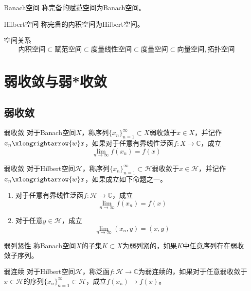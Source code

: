 \documentclass[lang = cn, scheme = chinese, thmcnt = section]{elegantbook}
\newcommand{\C}{\mathbb{C}}  		   %
\newcommand{\sub}{\subset}             %
\begin{document}
\begin{definition}{Banach空间}
	称完备的赋范空间为Banach空间。
\end{definition}

\begin{definition}{Hilbert空间}
	称完备的内积空间为Hilbert空间。
\end{definition}

\begin{proposition}{空间关系}
	$$
	\text{内积空间}
	\sub\text{赋范空间}
	\sub\text{度量线性空间}
	\sub\text{度量空间}
	\sub\text{向量空间},\text{拓扑空间}
	$$
\end{proposition}

\chapter{弱收敛与弱*收敛}

\section{弱收敛}

\begin{definition}{弱收敛}
	对于Banach空间$X$，称序列$\{x_n\}_{n=1}^{\infty}\sub X$弱收敛于$x\in X$，并记作$x_n\xlongrightarrow{w}x$，如果对于任意有界线性泛函$f:X\to\C$，成立
	$$
	\lim_{n\to\infty}f(x_n)=f(x)
	$$
\end{definition}

\begin{definition}{弱收敛}
	对于Hilbert空间$\mathcal{H}$，称序列$\{x_n\}_{n=1}^{\infty}\sub \mathcal{H}$弱收敛于$x\in\mathcal{H}$，并记作$x_n\xlongrightarrow{w}x$，如果成立如下命题之一。
	\begin{enumerate}
		\item 对于任意有界线性泛函$f:\mathcal{H}\to\C$，成立
		$$
		\lim_{n\to\infty}f(x_n)=f(x)
		$$
		\item 对于任意$y\in \mathcal{H}$，成立
		$$
		\lim_{n\to\infty}(x_n,y)=(x,y)
		$$
	\end{enumerate}
\end{definition}

\begin{definition}{弱列紧性}
	称Banach空间$X$的子集$K\sub X$为弱列紧的，如果$K$中任意序列存在弱收敛子序列。
\end{definition}

\begin{definition}{弱连续}
	对于Hilbert空间$\mathcal{H}$，称泛函$f:\mathcal{H}\to\C$为弱连续的，如果对于任意弱收敛于$x\in\mathcal{H}$的序列$\{x_n\}_{n=1}^{\infty}\sub \mathcal{H}$，成立$f(x_n)\to f(x)$。
\end{definition}
\end{document}
